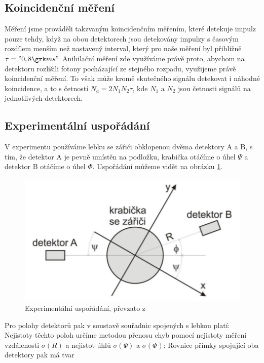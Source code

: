 \documentclass[10pt,a4paper]{article}
\begin{document}
\subsection*{Koincidenční měření}
Měření jsme prováděli takzvaným koincidenčním měřením, které detekuje impulz pouze tehdy, když na obou detektorech jsou detekovány impulzy s časovým rozdílem menším než nastavený interval, který pro naše měření byl přibližně $\tau="0,8 \micro s"$
Anihilační měření zde využíváme právě proto, abychom na detektoru rozlišili fotony pocházající ze stejného rozpadu, využijeme právě koincidenční měření. To však může kromě skutečného signálu detekovat i náhodné koincidence, a to s četností $N_a=2N_1N_2\tau$, kde $N_1$ a $N_2$ jsou četnosti signálů na jednotlivých detektorech.
\subsection*{Experimentální uspořádání}
V experimentu používáme lebku se zářiči obklopenou dvěma detektory A a B, s tím, že detektor A je pevně umístěn na podložku, krabička otáčíme o úhel $\Psi$ a detektor B otáčíme o úhel $\Phi$. Uspořádání můžeme vidět na obrázku \ref{usporadani}.
\begin{figure}[h]
\centering
\includegraphics{usporadani.png}
\caption{Experimentální uspořádání, převzato z \cite{studijnitext}}
\label{usporadani}
\end{figure}
Pro polohy detektorů pak v soustavě souřadnic spojených s lebkou platí:
Nejistoty těchto poloh určíme metodou přenosu chyb pomocí nejistoty měření vzdálenosti $\sigma(R)$ a nejistot úhlů $\sigma(\Psi)$ a $\sigma(\Phi)$:
Rovnice přímky spojující oba detektory pak má tvar \cite{studijnitext}
\end{document}
